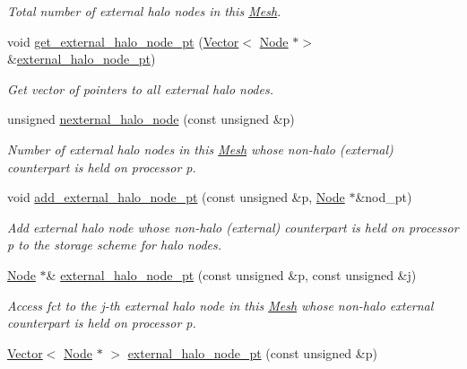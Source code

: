 \begin{DoxyCompactItemize}
\begin{DoxyCompactList}\small\item\em Total number of external halo nodes in this \hyperlink{classoomph_1_1Mesh}{Mesh}. \end{DoxyCompactList}\item 
void \hyperlink{classoomph_1_1Mesh_a2e86b43d431e92731c7a2f522d5c2af9}{get\+\_\+external\+\_\+halo\+\_\+node\+\_\+pt} (\hyperlink{classoomph_1_1Vector}{Vector}$<$ \hyperlink{classoomph_1_1Node}{Node} $\ast$$>$ \&\hyperlink{classoomph_1_1Mesh_a37ba13e88361aa90d5052db4835ddff3}{external\+\_\+halo\+\_\+node\+\_\+pt})
\begin{DoxyCompactList}\small\item\em Get vector of pointers to all external halo nodes. \end{DoxyCompactList}\item 
unsigned \hyperlink{classoomph_1_1Mesh_ad2225d34ba01c6f6b08f60baebab83fb}{nexternal\+\_\+halo\+\_\+node} (const unsigned \&p)
\begin{DoxyCompactList}\small\item\em Number of external halo nodes in this \hyperlink{classoomph_1_1Mesh}{Mesh} whose non-\/halo (external) counterpart is held on processor p. \end{DoxyCompactList}\item 
void \hyperlink{classoomph_1_1Mesh_ac0b818d3cf5f2eae2816574b6d0a4f07}{add\+\_\+external\+\_\+halo\+\_\+node\+\_\+pt} (const unsigned \&p, \hyperlink{classoomph_1_1Node}{Node} $\ast$\&nod\+\_\+pt)
\begin{DoxyCompactList}\small\item\em Add external halo node whose non-\/halo (external) counterpart is held on processor p to the storage scheme for halo nodes. \end{DoxyCompactList}\item 
\hyperlink{classoomph_1_1Node}{Node} $\ast$\& \hyperlink{classoomph_1_1Mesh_a37ba13e88361aa90d5052db4835ddff3}{external\+\_\+halo\+\_\+node\+\_\+pt} (const unsigned \&p, const unsigned \&j)
\begin{DoxyCompactList}\small\item\em Access fct to the j-\/th external halo node in this \hyperlink{classoomph_1_1Mesh}{Mesh} whose non-\/halo external counterpart is held on processor p. \end{DoxyCompactList}\item 
\hyperlink{classoomph_1_1Vector}{Vector}$<$ \hyperlink{classoomph_1_1Node}{Node} $\ast$ $>$ \hyperlink{classoomph_1_1Mesh_a06972b46c50a5a3f88a8a87cd1b54807}{external\+\_\+halo\+\_\+node\+\_\+pt} (const unsigned \&p)
$$
\end{DoxyCompactItemize}
